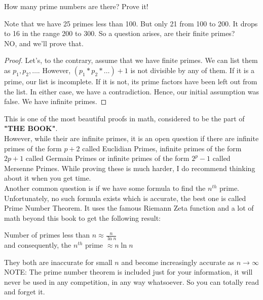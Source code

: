 \begin{example}
    How many prime numbers are there? Prove it!
\end{example}
Note that we have 25 primes less than 100. But only 21 from 100 to 200. It drops to 16 in the range 200 to 300. So a question arises, are their finite primes?\\
NO, and we'll prove that.
\begin{proof}
    Let's, to the contrary, assume that we have finite primes. We can list them as $p_1, p_2, \dots$. However, $(p_1*p_2*\dots)+1$ is not divisible by any of them. If it is a prime, our list is incomplete. If it is not, its prime factors have been left out from the list. In either case, we have a contradiction. Hence, our initial assumption was false. We have infinite primes.
\end{proof}
This is one of the most beautiful proofs in math, considered to be the part of \textbf{"THE BOOK"}.\\
However, while their are infinite primes, it is an open question if there are infinite primes of the form $p+2$ called Euclidian Primes, infinite primes of the form $2p+1$ called Germain Primes or infinite primes of the form $2^p-1$  called Mersenne Primes. While proving these is much harder, I do recommend thinking about it when you get time.\\
Another common question is if we have some formula to find the $n^{th}$ prime. Unfortunately, no such formula exists which is accurate, the best one is called Prime Number Theorem. It uses the famous Riemann Zeta function and a lot of math beyond this book to get the following result:
\begin{theorem}
    Number of primes less than $n \approx \frac{n}{\ln{n}}$\\
    and consequently, the $n^{th}$ prime $ \approx n \ln{n}$
\end{theorem}
They both are inaccurate for small $n$ and become increasingly accurate as $n \to \infty$\\
NOTE: The prime number theorem is included just for your information, it will never be used in any competition, in any way whatsoever. So you can totally read and forget it.\\
